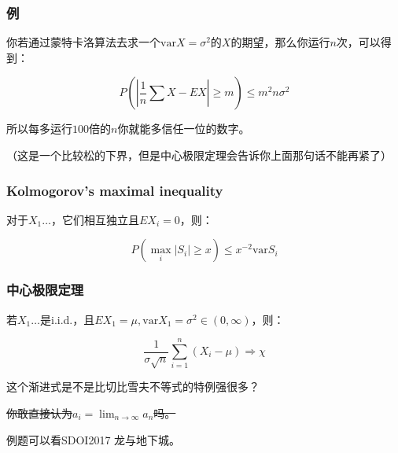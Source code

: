 \documentclass[10pt]{beamer}
\begin{document}
	\begin{frame}
		\frametitle{例}
	
		你若通过蒙特卡洛算法去求一个$\mathrm{var}X=\sigma^2$的$X$的期望，那么你运行$n$次，可以得到：

		$$
		P(|\dfrac 1n\sum X-EX|\ge m)\le m^2n\sigma^2
		$$

		所以每多运行$100$倍的$n$你就能多信任一位的数字。

		（这是一个比较松的下界，但是中心极限定理会告诉你上面那句话不能再紧了）
	
	\end{frame}
	\begin{frame}
		\frametitle{Kolmogorov’s maximal inequality}
	
		对于$X_1\dots $，它们相互独立且$EX_i=0$，则：

		$$
		P(\max_i |S_i|\ge x)\le x^{-2}\mathrm{var} S_i
		$$

	\end{frame}
	\begin{frame}
		\frametitle{中心极限定理}
	
		若$X_1\dots $是i.i.d.，且$EX_1=\mu, \mathrm{var}X_1=\sigma^2\in(0,\infty)$，则：

		$$
		\dfrac{1}{\sigma\sqrt n}\sum_{i=1}^n(X_i-\mu)\Rightarrow \chi 
		$$

		这个渐进式是不是比切比雪夫不等式的特例强很多？


		\sout{你敢直接认为$a_i=\lim_{n\rightarrow \infty} a_n$吗。}

		例题可以看SDOI2017 龙与地下城。
	
	\end{frame}
\end{document}
